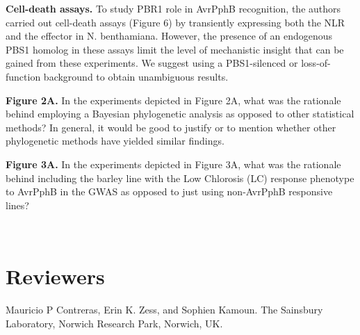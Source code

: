 \documentclass[10pt]{article}
\begin{document}
\par\null

\textbf{Cell-death assays.} To study PBR1 role in AvrPphB recognition,
the authors carried out cell-death assays (Figure 6) by transiently
expressing both the NLR and the effector in N. benthamiana. However, the
presence of an endogenous PBS1 homolog in these assays limit the level
of mechanistic insight that can be gained from these experiments. We
suggest using a PBS1-silenced or loss-of-function background to obtain
unambiguous results.~

\par\null

\textbf{Figure 2A.} In the experiments depicted in Figure 2A, what was
the rationale behind employing a Bayesian phylogenetic analysis as
opposed to other statistical methods? In general, it would be good to
justify or to mention whether other phylogenetic methods have yielded
similar findings.

\par\null

\textbf{Figure 3A.} In the experiments depicted in Figure 3A, what was
the rationale behind including the barley line with the Low Chlorosis
(LC) response phenotype to AvrPphB in the GWAS as opposed to just using
non-AvrPphB responsive lines?

\(\)

\section*{Reviewers}

{\label{924286}}\par\null

Mauricio P Contreras, Erin K. Zess, and Sophien Kamoun. The Sainsbury
Laboratory, Norwich Research Park, Norwich, UK.

\par\null

\FloatBarrier


\end{document}
